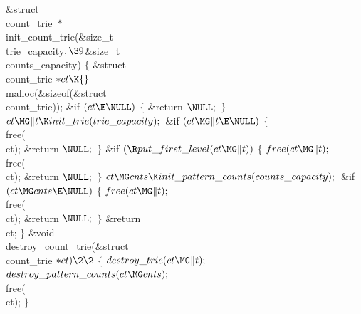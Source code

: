 \Y\B\1\1\&{struct} \\{count\_trie} ${}{*}{}$\\{init\_count\_trie}(\&{size\_t} %
\\{trie\_capacity}${},\39{}$\&{size\_t} \\{counts\_capacity})\2\2\6
${}\{{}$\1\6
\&{struct} \\{count\_trie} ${}{*}\\{ct}\K{}$\\{malloc}(\&{sizeof}(\&{struct} %
\\{count\_trie}));\7
\&{if} ${}(\\{ct}\E\NULL){}$\5
${}\{{}$\1\6
\&{return} ${}\NULL;{}$\6
\4${}\}{}$\2\6
${}\\{ct}\MG\|t\K\\{init\_trie}(\\{trie\_capacity});{}$\6
\&{if} ${}(\\{ct}\MG\|t\E\NULL){}$\5
${}\{{}$\1\6
\\{free}(\\{ct});\6
\&{return} ${}\NULL;{}$\6
\4${}\}{}$\2\6
\&{if} ${}(\R\\{put\_first\_level}(\\{ct}\MG\|t)){}$\5
${}\{{}$\1\6
${}\\{free}(\\{ct}\MG\|t);{}$\6
\\{free}(\\{ct});\6
\&{return} ${}\NULL;{}$\6
\4${}\}{}$\2\6
${}\\{ct}\MG\\{cnts}\K\\{init\_pattern\_counts}(\\{counts\_capacity});{}$\6
\&{if} ${}(\\{ct}\MG\\{cnts}\E\NULL){}$\5
${}\{{}$\1\6
${}\\{free}(\\{ct}\MG\|t);{}$\6
\\{free}(\\{ct});\6
\&{return} ${}\NULL;{}$\6
\4${}\}{}$\2\6
\&{return} \\{ct};\6
\4${}\}{}$\2\7
\1\1\&{void} \\{destroy\_count\_trie}(\&{struct} \\{count\_trie} ${}{*}\\{ct})%
\2\2{}$\6
${}\{{}$\1\6
${}\\{destroy\_trie}(\\{ct}\MG\|t);{}$\6
${}\\{destroy\_pattern\_counts}(\\{ct}\MG\\{cnts});{}$\6
\\{free}(\\{ct});\6
\4${}\}{}$\2\par
\fi

